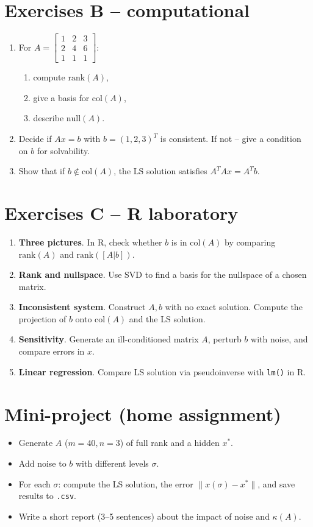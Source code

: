 \documentclass[12pt]{article}
\begin{document}
\section*{Exercises B – computational}
\begin{enumerate}[label=\textbf{B\arabic*}]
\item For $A=\begin{bmatrix}1&2&3\\2&4&6\\1&1&1\end{bmatrix}$:
\begin{enumerate}[label=(\alph*)]
\item compute $\mathrm{rank}(A)$,
\item give a basis for $\mathrm{col}(A)$,
\item describe $\mathrm{null}(A)$.
\end{enumerate}
\item Decide if $Ax=b$ with $b=(1,2,3)^T$ is consistent. If not – give a condition on $b$ for solvability.
\item Show that if $b \notin \mathrm{col}(A)$, the LS solution satisfies $A^TAx=A^Tb$.
\end{enumerate}

\section*{Exercises C – R laboratory}
\begin{enumerate}[label=\textbf{C\arabic*}]
\item \textbf{Three pictures}. In R, check whether $b$ is in $\mathrm{col}(A)$ by comparing $\mathrm{rank}(A)$ and $\mathrm{rank}([A|b])$.
\item \textbf{Rank and nullspace}. Use SVD to find a basis for the nullspace of a chosen matrix.
\item \textbf{Inconsistent system}. Construct $A,b$ with no exact solution. Compute the projection of $b$ onto $\mathrm{col}(A)$ and the LS solution.
\item \textbf{Sensitivity}. Generate an ill-conditioned matrix $A$, perturb $b$ with noise, and compare errors in $x$.
\item \textbf{Linear regression}. Compare LS solution via pseudoinverse with \texttt{lm()} in R.
\end{enumerate}

\section*{Mini-project (home assignment)}
\begin{itemize}
\item Generate $A$ ($m=40, n=3$) of full rank and a hidden $x^\ast$.
\item Add noise to $b$ with different levels $\sigma$.
\item For each $\sigma$: compute the LS solution, the error $\|x(\sigma)-x^\ast\|$, and save results to \texttt{.csv}.
\item Write a short report (3–5 sentences) about the impact of noise and $\kappa(A)$.
\end{itemize}
\end{document}
